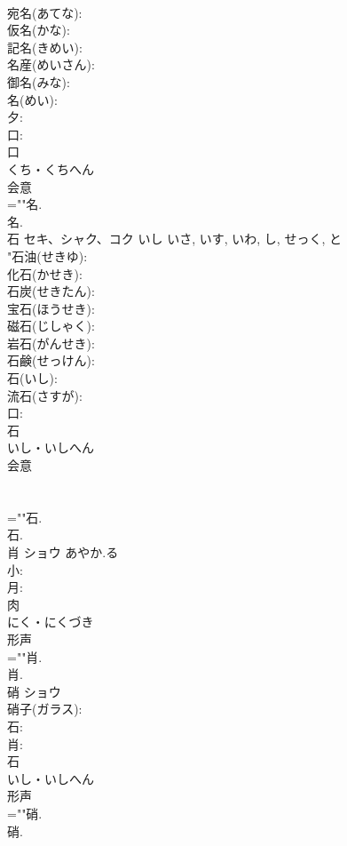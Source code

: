 \documentclass[8pt]{extreport}
\begin{document}
\begin{CJK}{UTF8}{min}
\\	宛名(あてな): 
\\	仮名(かな): 
\\	記名(きめい): 
\\	名産(めいさん): 
\\	御名(みな): 
\\	名(めい): 
\\	夕: 
\\	口: 
\\	口	
\\	くち・くちへん	
\\	会意 
\\	=""名.
\\	名.
\\	石	セキ、シャク、コク	いし	いさ, いす, いわ, し, せっく, と	
\\	"石油(せきゆ): 
\\	化石(かせき): 
\\	石炭(せきたん): 
\\	宝石(ほうせき): 
\\	磁石(じしゃく): 
\\	岩石(がんせき): 
\\	石鹸(せっけん): 
\\	石(いし): 
\\	流石(さすが): 
\\	口: 
\\	石	
\\	いし・いしへん	
\\	会意 
\\	[いし] 
\\	[ほうせき] 
\\	=""石.
\\	石.
\\	肖	ショウ	あやか.る		
\\	小: 
\\	月: 
\\	肉	
\\	にく・にくづき	
\\	形声 
\\	=""肖.
\\	肖.
\\	硝	ショウ			
\\	硝子(ガラス): 
\\	石: 
\\	肖: 
\\	石	
\\	いし・いしへん	
\\	形声 
\\	=""硝.
\\	硝.

\end{CJK}
\end{document}
